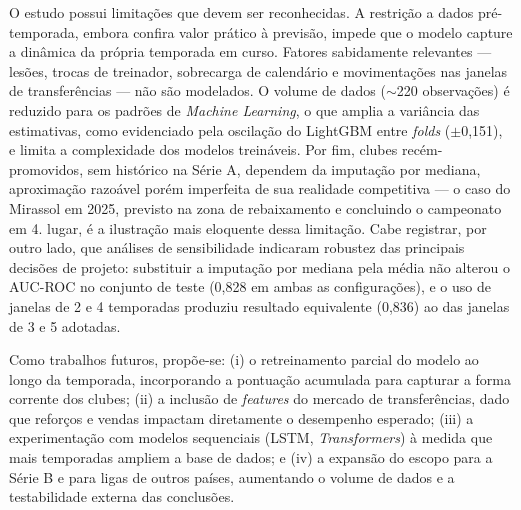 \documentclass[
    article,
    12pt,
    oneside,
    a4paper,
    english,
    brazilian
    ]{abntex2}
\begin{document}
O estudo possui limitações que devem ser reconhecidas. A restrição a dados pré-temporada, embora confira valor prático à previsão, impede que o modelo capture a dinâmica da própria temporada em curso. Fatores sabidamente relevantes --- lesões, trocas de treinador, sobrecarga de calendário e movimentações nas janelas de transferências --- não são modelados. O volume de dados ($\sim$220 observações) é reduzido para os padrões de \textit{Machine Learning}, o que amplia a variância das estimativas, como evidenciado pela oscilação do LightGBM entre \textit{folds} ($\pm$0,151), e limita a complexidade dos modelos treináveis. Por fim, clubes recém-promovidos, sem histórico na Série A, dependem da imputação por mediana, aproximação razoável porém imperfeita de sua realidade competitiva --- o caso do Mirassol em 2025, previsto na zona de rebaixamento e concluindo o campeonato em 4.\textordmasculine{} lugar, é a ilustração mais eloquente dessa limitação. Cabe registrar, por outro lado, que análises de sensibilidade indicaram robustez das principais decisões de projeto: substituir a imputação por mediana pela média não alterou o AUC-ROC no conjunto de teste (0,828 em ambas as configurações), e o uso de janelas de 2 e 4 temporadas produziu resultado equivalente (0,836) ao das janelas de 3 e 5 adotadas.

Como trabalhos futuros, propõe-se: (i) o retreinamento parcial do modelo ao longo da temporada, incorporando a pontuação acumulada para capturar a forma corrente dos clubes; (ii) a inclusão de \textit{features} do mercado de transferências, dado que reforços e vendas impactam diretamente o desempenho esperado; (iii) a experimentação com modelos sequenciais (LSTM, \textit{Transformers}) à medida que mais temporadas ampliem a base de dados; e (iv) a expansão do escopo para a Série B e para ligas de outros países, aumentando o volume de dados e a testabilidade externa das conclusões.



\end{document}
